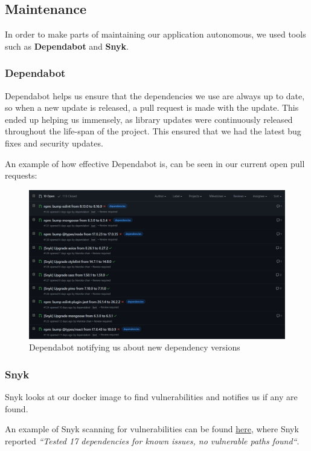 \documentclass{article}
\begin{document}
\subsection{Maintenance}
In order to make parts of maintaining our application autonomous, we used tools such as \textbf{Dependabot} and \textbf{Snyk}.

\subsubsection{Dependabot}
Dependabot helps us ensure that the dependencies we use are always up to date, so when a new update is released, a pull request is made with the update. This ended up helping us immensely, as library updates were continuously released throughout the life-span of the project. This ensured that we had the latest bug fixes and security updates.

An example of how effective Dependabot is, can be seen in our current open pull requests:
\begin{figure}[H]
    \centering
    \includegraphics[scale=0.45]{images/dependabot.png}
    \caption{Dependabot notifying us about new dependency versions }
\end{figure}

\newpage
\subsubsection{Snyk}
Snyk looks at our docker image to find vulnerabilities and notifies us if any are found.

An example of Snyk scanning for vulnerabilities can be found \href{https://github.com/AlexBMJ/minitwit/runs/6539384679?check_suite_focus=true}{here}, where Snyk reported \textit{``Tested 17 dependencies for known issues, no vulnerable paths found``}.
\end{document}
